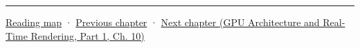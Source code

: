 \begin{center}\rule{0.5\linewidth}{0.5pt}\end{center}

\hyperref[volume-reading-map]{Reading map} · \hyperref[05-engine-i-ch017-ecs-performance-through-cache-and-scheduling]{Previous chapter} · \href{../06-GPU-Architecture-and-Real-Time-Rendering-P01/main.pdf\#nameddest=05-engine-i-ch019-gpu-work-and-reusable-metal-frames}{Next chapter (GPU Architecture and Real-Time Rendering, Part 1, Ch. 10)}
